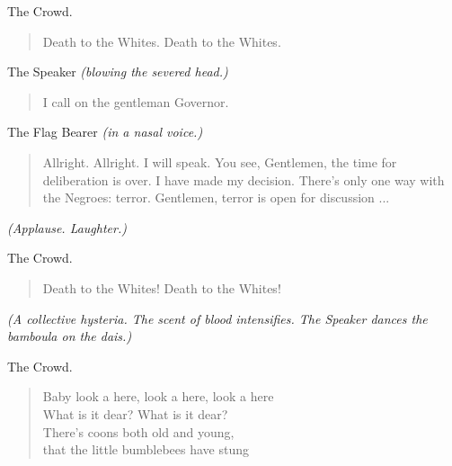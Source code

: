 \documentclass[letterpaper,article,12pt,oneside,notitlepage]{memoir}
\begin{document}
\begin{center}The Crowd.\end{center}

\begin{verse}
\hspace{1cm} Death to the Whites. Death to the Whites. \\
\end{verse}

\begin{center}The Speaker \textit{(blowing the severed head.)}\end{center}

\begin{verse}
\hspace{1cm} I call on the gentleman Governor. \\
\end{verse}

\begin{center}The Flag Bearer \textit{(in a nasal voice.)}\end{center}

\begin{verse}
\indent Allright. Allright. I will speak. You see, Gentlemen, the time for deliberation is over. I have made my decision. There's only one way with the Negroes: terror. Gentlemen, terror is open for discussion ... \\
\end{verse}

\textit{(Applause. Laughter.)}

\begin{center}The Crowd.\end{center}

\begin{verse}
\hspace{1cm} Death to the Whites! Death to the Whites! \\
\end{verse}

\textit{(A collective hysteria. The scent of blood intensifies. The Speaker dances the bamboula on the dais.)}

\begin{center}The Crowd.\end{center}

\begin{verse}
\hspace{1cm} Baby look a here, look a here, look a here \\
\hspace{1cm} What is it dear? What is it dear? \\
\hspace{1cm} There's coons both old and young, \\
\hspace{1cm} that the little bumblebees have stung \\
\end{verse}
\end{document}
